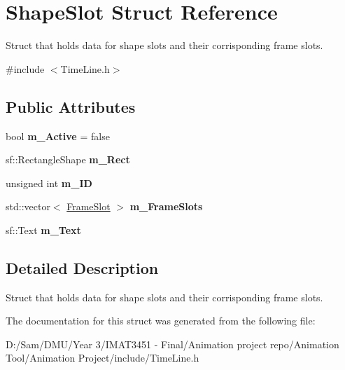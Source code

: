 \hypertarget{struct_shape_slot}{}\section{Shape\+Slot Struct Reference}
\label{struct_shape_slot}


Struct that holds data for shape slots and their corrisponding frame slots.  




{\ttfamily \#include $<$Time\+Line.\+h$>$}

\subsection*{Public Attributes}
\begin{DoxyCompactItemize}
\item 
\mbox{\label{struct_shape_slot_a523bedf57f5eaae9a7fb5de2dd301949}} 
bool {\bfseries m\+\_\+\+Active} = false
\item 
\mbox{\label{struct_shape_slot_a86672abb1093de577b94122c3727363d}} 
sf\+::\+Rectangle\+Shape {\bfseries m\+\_\+\+Rect}
\item 
\mbox{\label{struct_shape_slot_ac44e81e4ec1486a4a559cc6260079f7c}} 
unsigned int {\bfseries m\+\_\+\+ID}
\item 
\mbox{\label{struct_shape_slot_ad59dcd642205553eb786a5fd97e7fb98}} 
std\+::vector$<$ \hyperlink{struct_frame_slot}{Frame\+Slot} $>$ {\bfseries m\+\_\+\+Frame\+Slots}
\item 
\mbox{\label{struct_shape_slot_aad2e2b96f2145ac1fd16ea2582c060eb}} 
sf\+::\+Text {\bfseries m\+\_\+\+Text}
\end{DoxyCompactItemize}


\subsection{Detailed Description}
Struct that holds data for shape slots and their corrisponding frame slots. 

The documentation for this struct was generated from the following file\+:\begin{DoxyCompactItemize}
\item 
D\+:/\+Sam/\+D\+M\+U/\+Year 3/\+I\+M\+A\+T3451 -\/ Final/\+Animation project repo/\+Animation Tool/\+Animation Project/include/Time\+Line.\+h\end{DoxyCompactItemize}
